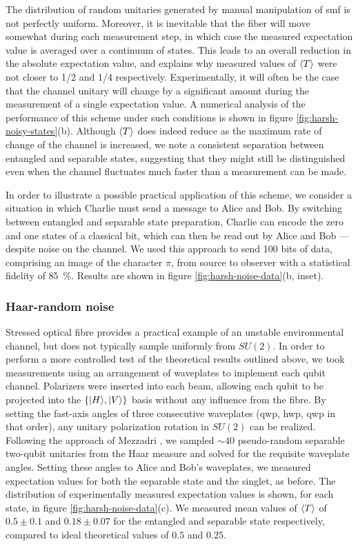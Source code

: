 The distribution of random unitaries generated by manual manipulation of \acrshort{smf} is not perfectly uniform. Moreover, it is inevitable that the fiber will move somewhat during each measurement step, in which case the measured expectation value is averaged over a continuum of states. This leads to an overall reduction in the absolute expectation value, and explains why measured values of $\langle T \rangle$ were not closer to 1/2 and 1/4 respectively. Experimentally, it will often be the case that the channel unitary will change by a significant amount during the measurement of a single expectation value. A numerical analysis of the performance of this scheme under such conditions is shown in figure \ref{fig:harsh-noisy-states}(b). Although $\langle T \rangle$ does indeed reduce as the maximum rate of change of the channel is increased, we note a consistent separation between entangled and separable states, suggesting that they might still be distinguished even when the channel fluctuates much faster than a measurement can be made.

In order to illustrate a possible practical application of this scheme, we consider a situation in which Charlie must send a message to Alice and Bob. By switching between entangled and separable state preparation, Charlie can encode the zero and one states of a classical bit, which can then be read out by Alice and Bob --- despite noise on the channel. We used this approach to send 100 bits of data, comprising an image of the character $\pi$, from source to observer with a statistical fidelity of \SI{85}{\percent}. Results are shown in figure \ref{fig:harsh-noise-data}(b, inset).

\subsubsection{Haar-random noise} 
Stressed optical fibre provides a practical example of an unstable environmental channel, but does not typically sample uniformly from $SU(2)$. In order to perform a more controlled test of the theoretical results outlined above, we took measurements using an arrangement of waveplates to implement each qubit channel. Polarizers were inserted into each beam, allowing each qubit to be projected into the $\{ \mbox{$ | H \rangle $}, \mbox{$ | V \rangle $} \}$ basis without any influence from the fibre. By setting the fast-axis angles of three consecutive waveplates (\gls{qwp}, \gls{hwp}, \gls{qwp} in that order), any unitary polarization rotation in $SU(2)$ can be realized.  Following the approach of Mezzadri \cite{Mezzadri2006}, we sampled $\sim 40$ pseudo-random separable two-qubit unitaries from the Haar measure and solved for the requisite waveplate angles. Setting these angles to Alice and Bob's waveplates, we measured expectation values for both the separable state and the singlet, as before. The distribution of experimentally measured expectation values is shown, for each state, in figure \ref{fig:harsh-noise-data}(c). We measured mean values of $\langle T \rangle$ of $0.5 \pm 0.1$ and $0.18 \pm 0.07$ for the entangled and separable state respectively, compared to ideal theoretical values of $0.5$ and $0.25$.

